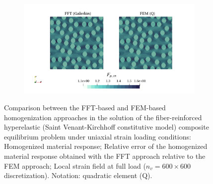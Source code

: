 \begin{figure}[hbt]
\begin{subfigure}[b]{0.49\textwidth}
    \caption{}
    \label{subfig:svk_2D_normal_material_response_error}
  \end{subfigure}
  \begin{subfigure}[b]{\textwidth}
    \centering
    \includegraphics[width=\textwidth]{figures/svk_mat_res_2D_normal_strain_11}
    \caption{}
    \label{subfig:svk_mat_res_2D_normal_strain_11}
  \end{subfigure}
  \caption{Comparison between the FFT-based and FEM-based homogenization approaches in the solution of the fiber-reinforced hyperelastic (Saint Venant-Kirchhoff constitutive model) composite equilibrium problem under uniaxial strain loading conditions:  Homogenized material response;  Relative error of the homogenized material response obtained with the FFT approach relative to the FEM approach;  Local strain field at full load (\(n_v = 600 \times 600\) discretization). Notation: quadratic element (Q).}
\label{fig:svk_mat_res_2D_normal}
\end{figure}

